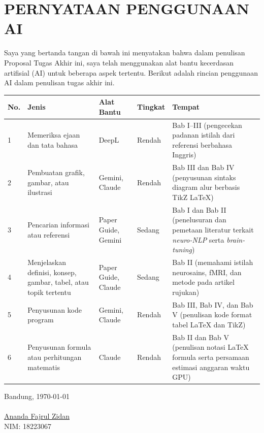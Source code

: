 \chapter*{PERNYATAAN PENGGUNAAN AI}
Saya yang bertanda tangan di bawah ini menyatakan bahwa dalam penulisan Proposal Tugas Akhir ini, saya telah menggunakan alat bantu kecerdasan artifisial (AI) untuk beberapa aspek tertentu. Berikut adalah rincian penggunaan AI dalam penulisan tugas akhir ini.
\begin{table}[h]
\centering
\small
\begin{tabularx}{\textwidth}{|p{0.5cm}| p{4cm} | p{1.8cm} | p{1.3cm} | X | }
\hline
\textbf{No.} & \textbf{Jenis} & \textbf{Alat Bantu} & \textbf{Tingkat} & \textbf{Tempat}\\
\hline
1 & Memeriksa ejaan dan tata bahasa & DeepL & Rendah & Bab I--III (pengecekan padanan istilah dari referensi berbahasa Inggris) \\
\hline
2 & Pembuatan grafik, gambar, atau ilustrasi & Gemini, Claude & Rendah & Bab III dan Bab IV (penyusunan sintaks diagram alur berbasis TikZ LaTeX) \\
\hline
3 & Pencarian informasi atau referensi & Paper Guide, Gemini & Sedang & Bab I dan Bab II (penelusuran dan pemetaan literatur terkait \textit{neuro-NLP} serta \textit{brain-tuning}) \\
\hline
4 & Menjelaskan definisi, konsep, gambar, tabel, atau topik tertentu & Paper Guide, Claude & Sedang & Bab II (memahami istilah neurosains, fMRI, dan metode pada artikel rujukan) \\
\hline
5 & Penyusunan kode program & Gemini, Claude & Rendah & Bab III, Bab IV, dan Bab V (penulisan kode format tabel LaTeX dan TikZ) \\
\hline
6 & Penyusunan formula atau perhitungan matematis & Claude & Rendah & Bab II dan Bab V (penulisan notasi LaTeX formula serta persamaan estimasi anggaran waktu GPU) \\
\hline
\end{tabularx}
\end{table}


Bandung, \today\\
\\[2cm]

\underline{Ananda  Fajrul Zidan} \\
NIM: 18223067
